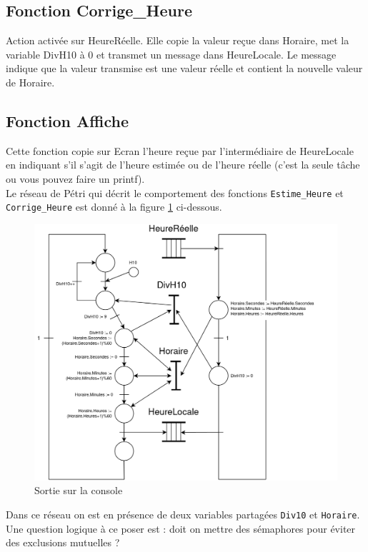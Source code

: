 \documentclass[french]{article}
\begin{document}
	\subsection*{Fonction Corrige\_Heure}
	
	Action activée sur HeureRéelle. Elle copie la valeur reçue dans Horaire, met la
variable DivH10 à 0 et transmet un message dans HeureLocale. Le message indique que la
valeur transmise est une valeur réelle et contient la nouvelle valeur de Horaire.
	
	\subsection*{Fonction Affiche}
	
	Cette fonction copie sur Ecran l’heure reçue par l’intermédiaire de HeureLocale en
indiquant s’il s’agit de l’heure estimée ou de l’heure réelle (c’est la seule tâche ou vous
pouvez faire un printf).\\
	
	
	Le réseau de Pétri qui décrit le comportement des fonctions \texttt{Estime\_Heure} et \texttt{Corrige\_Heure} est donné à la figure \ref{fig:reseau_petri} ci-dessous.
	
	
	\begin{figure}[H]
		\centering
		\includegraphics[width=13cm]{photo/reseau_petri}
		\caption{Sortie sur la console}
		\label{fig:reseau_petri}
	\end{figure}
	
	Dans ce réseau on est en présence de deux variables partagées \texttt{Div10} et \texttt{Horaire}. Une question logique à ce poser est : doit on mettre des sémaphores pour éviter des exclusions mutuelles ?\\
	
\end{document}
